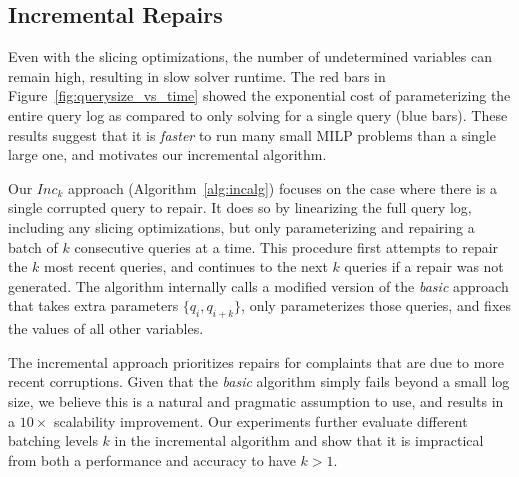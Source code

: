 \subsection{Incremental Repairs}\label{sec:incremental}



Even with the slicing optimizations, the number of undetermined variables can remain high, resulting in slow solver runtime.  
The red bars in Figure~\ref{fig:querysize_vs_time} showed the exponential cost of parameterizing the entire query log as compared to only solving for a single query (blue bars).
These results suggest that it is \emph{faster} to run many small MILP problems than a single large one, and motivates our incremental algorithm.

Our \emph{$Inc_k$} approach (Algorithm~\ref{alg:incalg}) focuses on the case where there is a single corrupted query to repair.
It does so by linearizing the full query log, including any slicing optimizations, but only parameterizing and repairing a batch of $k$ consecutive queries at a time. 
This procedure first attempts to repair the $k$ most recent queries, and continues to the next $k$ queries if a repair was not generated.
The algorithm internally calls a modified version of the \emph{basic} approach that takes extra parameters $\{q_i, q_{i+k}\}$, only parameterizes those queries, and fixes the values of all other variables.

The incremental approach prioritizes repairs for complaints that are due to more recent corruptions.
Given that the \emph{basic} algorithm simply fails beyond a small log size, we believe this is a natural and pragmatic assumption to use, and results in 
a $10\times$ scalability improvement.
Our experiments further evaluate different batching levels $k$ in the incremental algorithm and show that it is impractical from both a performance and accuracy to have $k > 1$.







